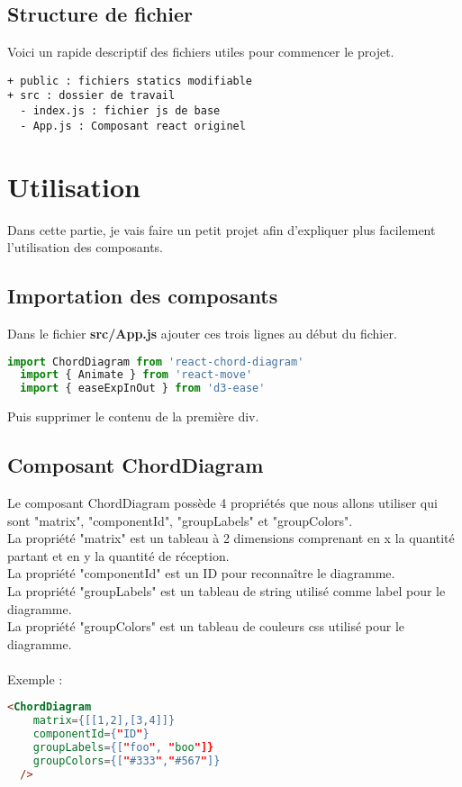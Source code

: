 \documentclass[a4paper, french, 12pt]{extarticle}
\begin{document}
\subsection{Structure de fichier}
Voici un rapide descriptif des fichiers utiles pour commencer le projet.
\begin{lstlisting}
+ public : fichiers statics modifiable
+ src : dossier de travail
  - index.js : fichier js de base
  - App.js : Composant react originel
\end{lstlisting}

\section{Utilisation}
Dans cette partie, je vais faire un petit projet afin d'expliquer plus facilement l'utilisation des composants.
\subsection{Importation des composants}
Dans le fichier \textbf{src/App.js} ajouter ces trois lignes au début du fichier.
\begin{lstlisting}[language=JavaScript]
  import ChordDiagram from 'react-chord-diagram'
  import { Animate } from 'react-move'
  import { easeExpInOut } from 'd3-ease'
\end{lstlisting}
Puis supprimer le contenu de la première div.

\subsection{Composant ChordDiagram}
Le composant ChordDiagram possède 4 propriétés que nous allons utiliser qui sont "matrix", "componentId", "groupLabels" et "groupColors".\\
La propriété "matrix" est un tableau à 2 dimensions comprenant en x la quantité partant et en y la quantité de réception.\\
La propriété "componentId" est un ID pour reconnaître le diagramme.\\
La propriété "groupLabels" est un tableau de string utilisé comme label pour le diagramme.\\
La propriété "groupColors" est un tableau de couleurs css utilisé pour le diagramme.\\\\
Exemple : 
\begin{lstlisting}[language=html]
  <ChordDiagram
    matrix={[[1,2],[3,4]]}
    componentId={"ID"}
    groupLabels={["foo", "boo"]}
    groupColors={["#333","#567"]}
  />
\end{lstlisting}
\end{document}
